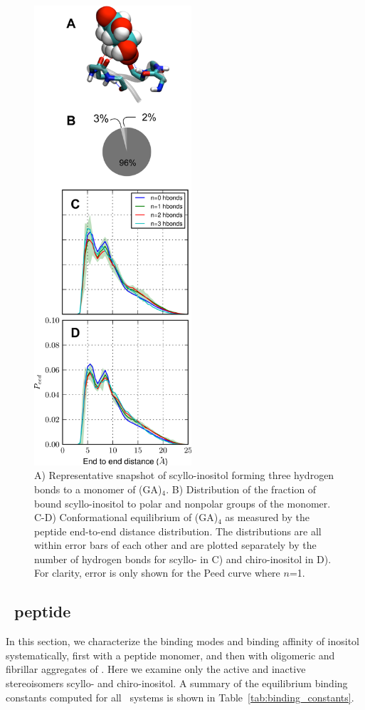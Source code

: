 \begin{figure}[ht]
  \centering
  \includegraphics[width=221px]{figures/results1/GA4_paper_figures_submitted-3}
  \caption[Binding of scyllo-inositol to the monomer of (GA)$_4$.]{A) Representative snapshot of scyllo-inositol forming three hydrogen bonds to a monomer of (GA)$_4$. B) Distribution of the fraction of bound scyllo-inositol to polar and nonpolar groups of the monomer. C-D) Conformational equilibrium of (GA)$_4$ as measured by the peptide end-to-end distance distribution. The distributions are all within error bars of each other and are plotted separately by the number of hydrogen bonds for scyllo- in C) and chiro-inositol in D). For clarity, error is only shown for the Peed curve where $n$=1.}
   \label{fig:figure3}
\end{figure}

\subsection{\gafour\ peptide}
In this section, we characterize the binding modes and binding affinity of inositol systematically, first with a peptide monomer, and then with oligomeric and fibrillar aggregates of \gafour. Here we examine only the active and inactive stereoisomers scyllo- and chiro-inositol. A summary of the equilibrium binding constants computed for all \gafour\ systems is shown in Table~\ref{tab:binding_constants}.

